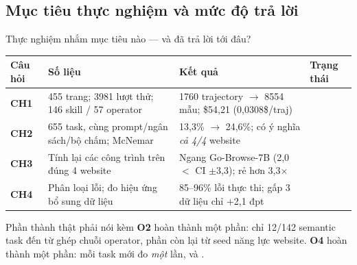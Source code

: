 \subsection{Mục tiêu thực nghiệm và mức độ trả lời}
\begin{frame}{Thực nghiệm nhắm mục tiêu nào --- và đã trả lời tới đâu?}
  \scriptsize
  \setlength{\tabcolsep}{3pt}
  \renewcommand{\arraystretch}{1.15}
  \begin{tabular}{@{}L{0.9cm} L{4.5cm} L{4.9cm} L{1.5cm}@{}}
    \toprule
    \textbf{Câu hỏi} & \textbf{Số liệu} & \textbf{Kết quả} & \textbf{Trạng thái} \\
    \midrule
    \textbf{CH1} & 455 trang; 3981 lượt thử; 146 skill / 57 operator &
    1760 trajectory $\rightarrow$ 8554 mẫu; \$54,21 (0,0308\$/traj) &  \\
    \textbf{CH2} & 655 task, cùng prompt/ngân sách/bộ chấm; McNemar &
    13,3\% $\rightarrow$ 24,6\%; có ý nghĩa \emph{cả 4/4} website &  \\
    \textbf{CH3} & Tính lại các công trình trên đúng 4 website &
    Ngang Go-Browse-7B (2,0 $<$ CI $\pm$3,3); rẻ hơn 3,3$\times$ &  \\
    \textbf{CH4} & Phân loại lỗi; đo hiệu ứng bổ sung dữ liệu &
    85--96\% lỗi thực thi; gấp 3 dữ liệu chỉ $+$2,1 đpt &  \\
    \bottomrule
  \end{tabular}

  \vspace{0.12cm}
  \begin{alertblock}{Phần thành thật phải nói kèm}
    \scriptsize
    \textbf{O2} hoàn thành một phần: chỉ 12/142 semantic task đến từ ghép chuỗi
    operator, phần còn lại từ seed năng lực website. \textbf{O4} hoàn thành một phần:
    mỗi task mới đo \emph{một} lần, và .
  \end{alertblock}
\end{frame}
